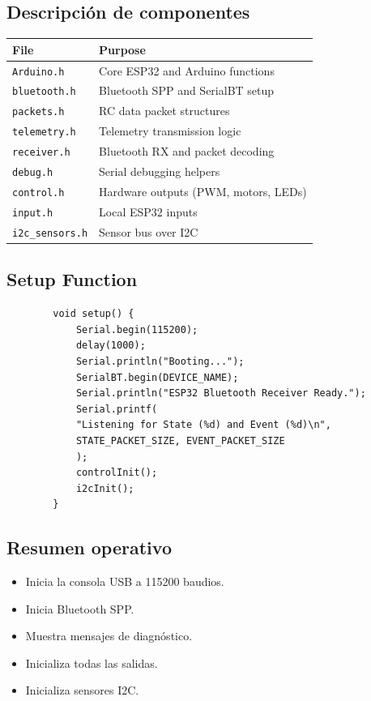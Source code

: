 \documentclass[12pt,a4paper]{article}
\begin{document}
\subsection*{Descripción de componentes}
\begin{center}
	\renewcommand{\arraystretch}{1.35}
	\setlength{\tabcolsep}{14pt}

	\begin{tabular}{@{} l p{8cm} @{}}
		\rowcolor{arduinoGreen!25}
		\textbf{File}           & \textbf{Purpose}                     \\ \midrule
		\texttt{Arduino.h}      & Core ESP32 and Arduino functions     \\
		\texttt{bluetooth.h}    & Bluetooth SPP and SerialBT setup     \\
		\texttt{packets.h}      & RC data packet structures            \\
		\texttt{telemetry.h}    & Telemetry transmission logic         \\
		\texttt{receiver.h}     & Bluetooth RX and packet decoding     \\
		\texttt{debug.h}        & Serial debugging helpers             \\
		\texttt{control.h}      & Hardware outputs (PWM, motors, LEDs) \\
		\texttt{input.h}        & Local ESP32 inputs                   \\
		\texttt{i2c\_sensors.h} & Sensor bus over I2C                  \\
	\end{tabular}
\end{center}


\subsection{Setup Function}

\begin{lstlisting}
		void setup() {
			Serial.begin(115200);
			delay(1000);
			Serial.println("Booting...");
			SerialBT.begin(DEVICE_NAME);
			Serial.println("ESP32 Bluetooth Receiver Ready.");
			Serial.printf(
			"Listening for State (%d) and Event (%d)\n", 
			STATE_PACKET_SIZE, EVENT_PACKET_SIZE
			);
			controlInit();
			i2cInit();
		}
	\end{lstlisting}

\subsection*{Resumen operativo}
\begin{itemize}
	\item Inicia la consola USB a 115200 baudios.
	\item Inicia Bluetooth SPP.
	\item Muestra mensajes de diagnóstico.
	\item Inicializa todas las salidas.
	\item Inicializa sensores I2C.
\end{itemize}
\end{document}
